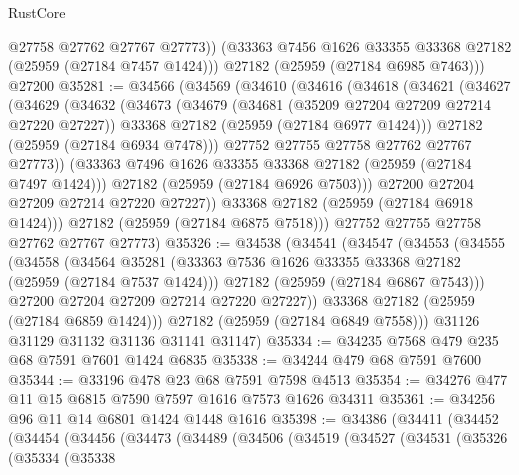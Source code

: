 \begin{lexlean}{RustCore}
\begin{coremodule}
          @27758
          @27762
          @27767
          @27773))
      (@33363 @7456 @1626 @33355 @33368 @27182 (@25959 (@27184 @7457 @1424)))
      @27182
      (@25959 (@27184 @6985 @7463)))
    @27200
@35281 := @34566
    (@34569
      (@34610
        (@34616
          (@34618
            (@34621
              (@34627
                (@34629
                  (@34632
                    (@34673
                      (@34679
                        (@34681 (@35209 @27204 @27209 @27214 @27220 @27227))
                        @33368
                        @27182
                        (@25959 (@27184 @6977 @1424)))
                      @27182
                      (@25959 (@27184 @6934 @7478)))
                    @27752
                    @27755
                    @27758
                    @27762
                    @27767
                    @27773))
                (@33363 @7496 @1626 @33355 @33368 @27182 (@25959 (@27184 @7497 @1424)))
                @27182
                (@25959 (@27184 @6926 @7503)))
              @27200
              @27204
              @27209
              @27214
              @27220
              @27227))
          @33368
          @27182
          (@25959 (@27184 @6918 @1424)))
        @27182
        (@25959 (@27184 @6875 @7518)))
      @27752
      @27755
      @27758
      @27762
      @27767
      @27773)
@35326 := @34538
    (@34541
      (@34547
        (@34553
          (@34555
            (@34558
              (@34564
                @35281
                (@33363 @7536 @1626 @33355 @33368 @27182 (@25959 (@27184 @7537 @1424)))
                @27182
                (@25959 (@27184 @6867 @7543)))
              @27200
              @27204
              @27209
              @27214
              @27220
              @27227))
          @33368
          @27182
          (@25959 (@27184 @6859 @1424)))
        @27182
        (@25959 (@27184 @6849 @7558)))
      @31126
      @31129
      @31132
      @31136
      @31141
      @31147)
@35334 := @34235 @7568 @479 @235 @68 @7591 @7601 @1424 @6835
@35338 := @34244 @479 @68 @7591 @7600
@35344 := @33196 @478 @23 @68 @7591 @7598 @4513
@35354 := @34276 @477 @11 @15 @6815 @7590 @7597 @1616 @7573 @1626 @34311
@35361 := @34256 @96 @11 @14 @6801 @1424 @1448 @1616
@35398 := @34386
    (@34411
      (@34452
        (@34454
          (@34456
            (@34473
              (@34489
                (@34506
                  (@34519
                    (@34527
                      (@34531
                        (@35326
                          (@35334
                            (@35338

\end{coremodule}
\end{lexlean}
